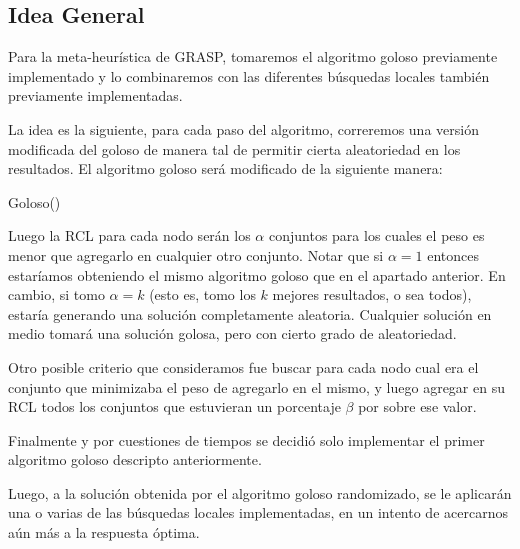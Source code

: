 \subsection{Idea General}

Para la meta-heurística de GRASP, tomaremos el algoritmo goloso previamente implementado y lo combinaremos con las diferentes búsquedas locales también previamente implementadas.

La idea es la siguiente, para cada paso del algoritmo, correremos una versión modificada del goloso de manera tal de permitir cierta aleatoriedad en los resultados. El algoritmo goloso será modificado de la siguiente manera:

\begin{algorithm}
  \begin{algorithmic}[1]\parskip=1mm
 \caption{ Goloso()}
\end{algorithmic}
\end{algorithm} 

Luego la RCL para cada nodo serán los $\alpha$ conjuntos para los cuales el peso es menor que agregarlo en cualquier otro conjunto. Notar que si $\alpha=1$ entonces estaríamos obteniendo el mismo algoritmo goloso que en el apartado anterior. En cambio, si tomo $\alpha = k$ (esto es, tomo los $k$ mejores resultados, o sea todos), estaría generando una solución completamente aleatoria. Cualquier solución en medio tomará una solución golosa, pero con cierto grado de aleatoriedad.

Otro posible criterio que consideramos fue buscar para cada nodo cual era el conjunto que minimizaba el peso de agregarlo en el mismo, y luego agregar en su RCL todos los conjuntos que estuvieran un porcentaje $\beta$ por sobre ese valor.

Finalmente y por cuestiones de tiempos se decidió solo implementar el primer algoritmo goloso descripto anteriormente.

Luego, a la solución obtenida por el algoritmo goloso randomizado, se le aplicarán una o varias de las búsquedas locales implementadas, en un intento de acercarnos aún más a la respuesta óptima.

